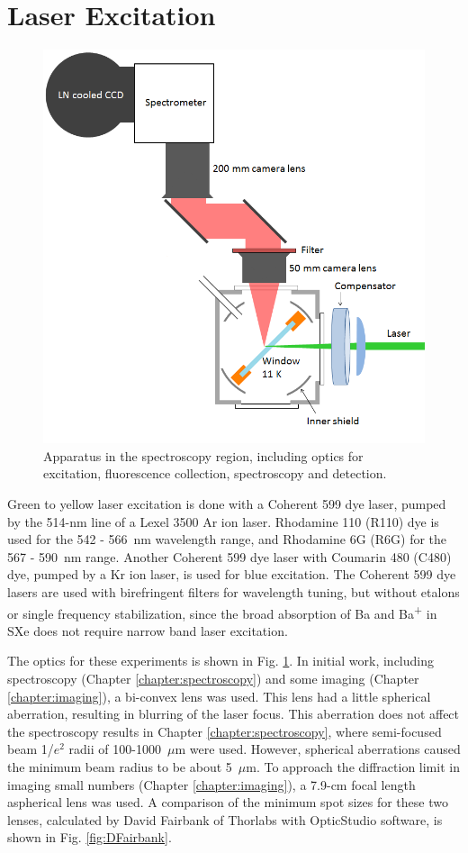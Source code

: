 \section{Laser Excitation}
\label{sec:laser}

\begin{figure} %
        \centering
                \includegraphics[width=.7\textwidth]{figures/window_etc_justOptics.png}
                \caption{Apparatus in the spectroscopy region, including optics for excitation, fluorescence collection, spectroscopy and detection.}
\label{fig:endOfBeamOptics}
\end{figure}

Green to yellow laser excitation is done with a Coherent 599 dye laser, pumped by the 514-nm line of a Lexel 3500 Ar ion laser.  Rhodamine 110 (R110) dye is used for the 542 - 566~nm wavelength range, and Rhodamine 6G (R6G) for the 567 - 590~nm range.  Another Coherent 599 dye laser with Coumarin 480 (C480) dye, pumped by a Kr ion laser, is used for blue excitation.  The Coherent 599 dye lasers are used with birefringent filters for wavelength tuning, but without etalons or single frequency stabilization, since the broad absorption of Ba and Ba\textsuperscript{+} in SXe does not require narrow band laser excitation.

The optics for these experiments is shown in Fig. \ref{fig:endOfBeamOptics}.  In initial work, including spectroscopy (Chapter \ref{chapter:spectroscopy}) and some imaging (Chapter \ref{chapter:imaging}), a bi-convex lens was used.  This lens had a little spherical aberration, resulting in blurring of the laser focus.  This aberration does not affect the spectroscopy results in Chapter \ref{chapter:spectroscopy}, where semi-focused beam 1/$e^{2}$ radii of 100-1000~$\mu$m were used.  However, spherical aberrations caused the minimum beam radius to be about 5~$\mu$m.  To approach the diffraction limit in imaging small numbers (Chapter \ref{chapter:imaging}), a 7.9-cm focal length aspherical lens was used.  A comparison of the minimum spot sizes for these two lenses, calculated by David Fairbank of Thorlabs with OpticStudio software, is shown in Fig. \ref{fig:DFairbank}.


